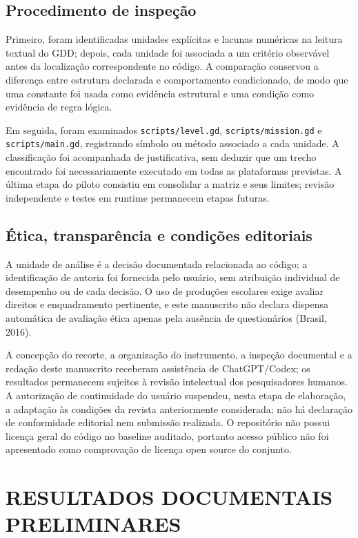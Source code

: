 \subsection{Procedimento de inspeção}
Primeiro, foram identificadas unidades explícitas e lacunas numéricas na leitura textual do GDD; depois, cada unidade foi associada a um critério observável antes da localização correspondente no código. A comparação conservou a diferença entre estrutura declarada e comportamento condicionado, de modo que uma constante foi usada como evidência estrutural e uma condição como evidência de regra lógica.

Em seguida, foram examinados \texttt{scripts/level.gd}, \texttt{scripts/mission.gd} e \texttt{scripts/main.gd}, registrando símbolo ou método associado a cada unidade. A classificação foi acompanhada de justificativa, sem deduzir que um trecho encontrado foi necessariamente executado em todas as plataformas previstas. A última etapa do piloto consistiu em consolidar a matriz e seus limites; revisão independente e testes em runtime permanecem etapas futuras.

\subsection{Ética, transparência e condições editoriais}
A unidade de análise é a decisão documentada relacionada ao código; a identificação de autoria foi fornecida pelo usuário, sem atribuição individual de desempenho ou de cada decisão. O uso de produções escolares exige avaliar direitos e enquadramento pertinente, e este manuscrito não declara dispensa automática de avaliação ética apenas pela ausência de questionários (Brasil, 2016).

A concepção do recorte, a organização do instrumento, a inspeção documental e a redação deste manuscrito receberam assistência de ChatGPT/Codex; os resultados permanecem sujeitos à revisão intelectual dos pesquisadores humanos. A autorização de continuidade do usuário suspendeu, nesta etapa de elaboração, a adaptação às condições da revista anteriormente considerada; não há declaração de conformidade editorial nem submissão realizada. O repositório não possui licença geral do código no baseline auditado, portanto acesso público não foi apresentado como comprovação de licença open source do conjunto.

\section{RESULTADOS DOCUMENTAIS PRELIMINARES}
